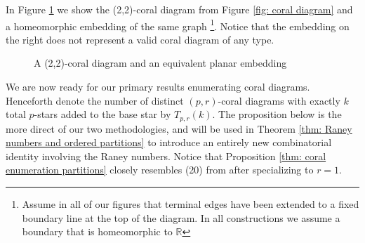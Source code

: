 \documentclass[documentfleqn,12pt]{amsart}
\def\R{\mathbb{R}}
\begin{document}
In Figure \ref{fig: tree rotation} we show the (2,2)-coral diagram from Figure \ref{fig: coral diagram} and a homeomorphic embedding of the same graph \footnote{Assume in all of our figures that terminal edges have been extended to a fixed boundary line at the top of the diagram.  In all constructions we assume a boundary that is homeomorphic to $\R$}.  Notice that the embedding on the right does not represent a valid coral diagram of any type.

\begin{figure}[h!]
\hspace{.15in}
\scalebox{2.5}{\raisebox{12pt}{$\sim$}}
\hspace{.15in}
\caption{A (2,2)-coral diagram and an equivalent planar embedding}
\label{fig: tree rotation}
\end{figure}

We are now ready for our primary results enumerating coral diagrams.  Henceforth denote the number of distinct $(p,r)$-coral diagrams with exactly $k$ total $p$-stars added to the base star by $T_{p,r}(k)$.  The proposition below is the more direct of our two methodologies, and will be used in Theorem \ref{thm: Raney numbers and ordered partitions} to introduce an entirely new combinatorial identity involving the Raney numbers.  Notice that Proposition \ref{thm: coral enumeration partitions} closely resembles (20) from \cite{Klarner} after specializing to $r=1$.
\end{document}
